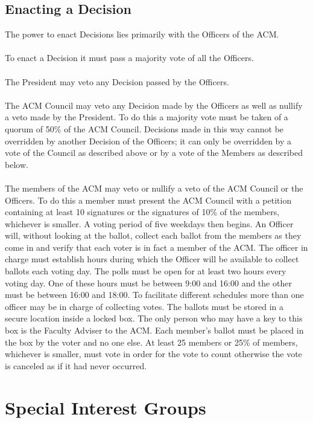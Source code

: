 \documentclass[12pt,titlepage]{article}
\begin{document}
\subsection{Enacting a Decision}

The power to enact Decisions lies primarily with the Officers of the ACM.\\
\\
To enact a Decision it must pass a majority vote of all the Officers.\\
\\
The President may veto any Decision passed by the Officers.\\
\\
The ACM Council may veto any Decision made by the Officers as well as nullify a veto made by the President. To do this a majority vote must be taken of a quorum of 50\% of the ACM Council. Decisions made in this way cannot be overridden by another Decision of the Officers; it can only be overridden by a vote of the Council as described above or by a vote of the Members as described below.\\
\\
The members of the ACM may veto or nullify a veto of the ACM Council or the Officers. To do this a member must present the ACM Council with a petition containing at least 10 signatures or the signatures of 10\% of the members, whichever is smaller. A voting period of five weekdays then begins. An Officer will, without looking at the ballot, collect each ballot from the members as they come in and verify that each voter is in fact a member of the ACM. The officer in charge must establish hours during which the Officer will be available to collect ballots each voting day. The polls must be open for at least two hours every voting day. One of these hours must be between 9:00 and 16:00 and the other must be between 16:00 and 18:00. To facilitate different schedules more than one officer may be in charge of collecting votes. The ballots must be stored in a secure location inside a locked box. The only person who may have a key to this box is the Faculty Adviser to the ACM. Each member's ballot must be placed in the box by the voter and no one else. At least 25 members or 25\% of members, whichever is smaller, must vote in order for the vote to count otherwise the vote is canceled as if it had never occurred.

\section{Special Interest Groups}
\end{document}

